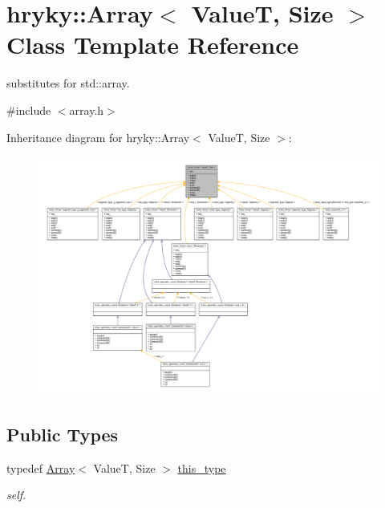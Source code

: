 \hypertarget{classhryky_1_1_array}{\section{hryky\-:\-:Array$<$ Value\-T, Size $>$ Class Template Reference}
\label{classhryky_1_1_array}
}


substitutes for std\-::array.  




{\ttfamily \#include $<$array.\-h$>$}



Inheritance diagram for hryky\-:\-:Array$<$ Value\-T, Size $>$\-:
\nopagebreak
\begin{figure}[H]
\begin{center}
\leavevmode
\includegraphics[width=350pt]{classhryky_1_1_array__inherit__graph}
\end{center}
\end{figure}
\subsection*{Public Types}
\begin{DoxyCompactItemize}
\item 
\hypertarget{classhryky_1_1_array_ace26d248a47909ee3875cb7b5a2047e6}{typedef \hyperlink{classhryky_1_1_array}{Array}$<$ Value\-T, Size $>$ \hyperlink{classhryky_1_1_array_ace26d248a47909ee3875cb7b5a2047e6}{this\-\_\-type}}\label{classhryky_1_1_array_ace26d248a47909ee3875cb7b5a2047e6}

\begin{DoxyCompactList}\small\item\em self. \end{DoxyCompactList}\end{DoxyCompactItemize}
